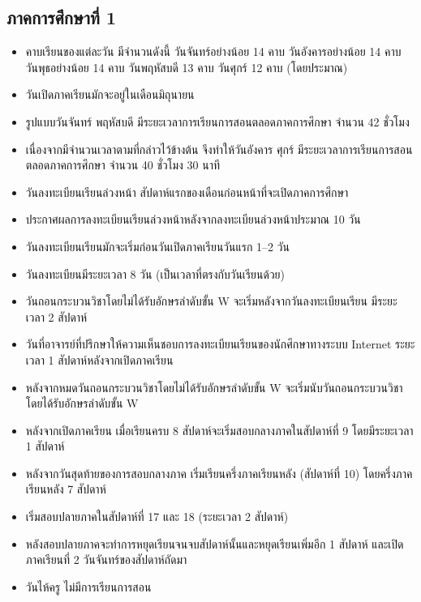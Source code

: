 \subsection{ภาคการศึกษาที่ 1}
 
\begin{itemize}
  \item   คาบเรียนของแต่ละวัน มีจำนวนดังนี้ วันจันทร์อย่างน้อย 14 คาบ วันอังคารอย่างน้อย 14 คาบ วันพุธอย่างน้อย 14 คาบ วันพฤหัสบดี 13 คาบ วันศุกร์ 12 คาบ (โดยประมาณ)  
  \item วันเปิดภาคเรียนมักจะอยู่ในเดือนมิถุนายน
  \item รูปแบบวันจันทร์ พฤหัสบดี มีระยะเวลาการเรียนการสอนตลอดภาคการศึกษา จำนวน 42 ชั่วโมง
  \item เนื่องจากมีจำนวนเวลาตามที่กล่าวไว้ข้างต้น จึงทำให้วันอังคาร ศุกร์ มีระยะเวลาการเรียนการสอนตลอดภาคการศึกษา จำนวน 40 ชั่วโมง 30 นาที 
  \item วันลงทะเบียนเรียนล่วงหน้า สัปดาห์แรกของเดือนก่อนหน้าที่จะเปิดภาคการศึกษา
  \item ประกาศผลการลงทะเบียนเรียนล่วงหน้าหลังจากลงทะเบียนล่วงหน้าประมาณ 10 วัน
  \item วันลงทะเบียนเรียนมักจะเริ่มก่อนวันเปิดภาคเรียนวันแรก 1--2 วัน
  \item วันลงทะเบียนมีระยะเวลา 8 วัน (เป็นเวลาที่ตรงกับวันเรียนด้วย)
  \item วันถอนกระบวนวิชาโดยไม่ได้รับอักษรลำดับขั้น W จะเริ่มหลังจากวันลงทะเบียนเรียน มีระยะเวลา 2 สัปดาห์
  \item วันที่อาจารย์ที่ปรึกษาให้ความเห็นชอบการลงทะเบียนเรียนของนักศึกษาทางระบบ Internet ระยะเวลา 1 สัปดาห์หลังจากเปิดภาคเรียน
  \item หลังจากหมดวันถอนกระบวนวิชาโดยไม่ได้รับอักษรลำดับขั้น W จะเริ่มนับวันถอนกระบวนวิชาโดยได้รับอักษรลำดับขั้น W
  \item หลังจากเปิดภาคเรียน เมื่อเรียนครบ 8 สัปดาห์จะเริ่มสอบกลางภาคในสัปดาห์ที่ 9 โดยมีระยะเวลา 1 สัปดาห์
  \item หลังจากวันสุดท้ายของการสอบกลางภาค เริ่มเรียนครึ่งภาคเรียนหลัง (สัปดาห์ที่ 10) โดยครึ่งภาคเรียนหลัง 7 สัปดาห์
  \item เริ่มสอบปลายภาคในสัปดาห์ที่ 17 และ 18 (ระยะเวลา 2 สัปดาห์)
  \item หลังสอบปลายภาคจะทำการหยุดเรียนจนจบสัปดาห์นั้นและหยุดเรียนเพิ่มอีก 1 สัปดาห์ และเปิดภาคเรียนที่ 2 วันจันทร์ของสัปดาห์ถัดมา
  \item วันไห้ครู ไม่มีการเรียนการสอน
  
\end{itemize}

